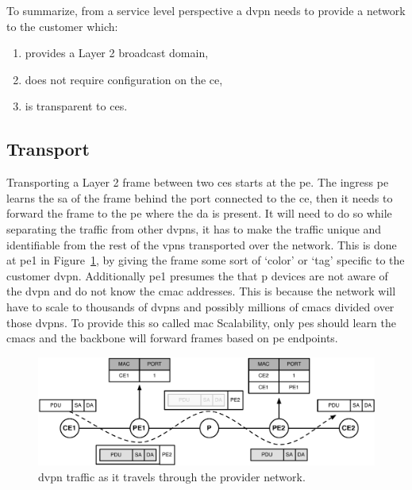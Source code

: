 To summarize, from a service level perspective a \ac{dvpn} needs to provide a network to the customer which:

\begin{enumerate}
	\item provides a Layer 2 broadcast domain,
	\item does not require configuration on the \ac{ce},
	\item is transparent to \acp{ce}.
\end{enumerate}


\subsection{Transport} %
\label{sub:transport}

Transporting a Layer 2 frame between two \acp{ce} starts at the \ac{pe}. The ingress \ac{pe} learns the \ac{sa} of the frame behind the port connected to the \ac{ce}, then it needs to forward the frame to the \ac{pe} where the \ac{da} is present. It will need to do so while separating the traffic from other \acp{dvpn}, it has to make the traffic unique and identifiable from the rest of the \acp{vpn} transported over the network. This is done at \ac{pe}1 in Figure~\ref{fig:vpn-traffic}, by giving the frame some sort of `color' or `tag' specific to the customer \ac{dvpn}. Additionally \ac{pe}1 presumes the that \ac{p} devices are not aware of the \ac{dvpn} and do not know the \ac{cmac} addresses. This is because the network will have to scale to thousands of \acp{dvpn} and possibly millions of \acp{cmac} divided over those \acp{dvpn}. To provide this so called \acs{mac} Scalability, only \acp{pe} should learn the \acp{cmac} and the backbone will forward frames based on \ac{pe} endpoints.

\begin{figure}[!h]
	\centering
	\includegraphics[width=14cm]{./includes/vpn-traffic.pdf}
	\caption{\ac{dvpn} traffic as it travels through the provider network.}
	\label{fig:vpn-traffic}
\end{figure}

